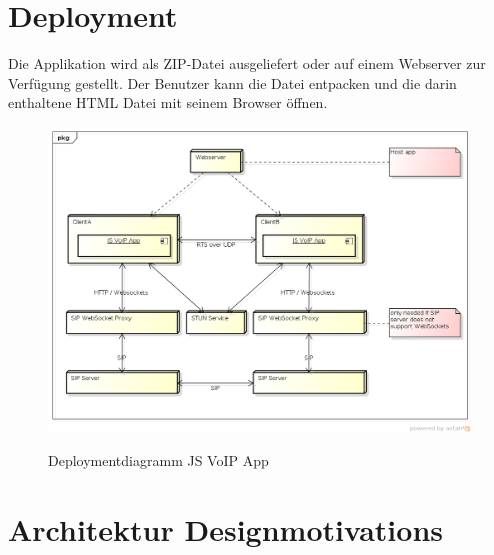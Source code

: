 \section{Deployment}
	Die Applikation wird als ZIP-Datei ausgeliefert oder auf einem Webserver zur Verfügung gestellt. Der Benutzer kann die Datei entpacken und die darin enthaltene HTML Datei mit seinem Browser öffnen.
	\begin{figure}[h]
		\centering
		\includegraphics[width=1\textwidth]{img/deployment.png}
		\label{img:deployment}
		\caption{Deploymentdiagramm JS VoIP App}
	\end{figure}

\section{Architektur Designmotivations}
